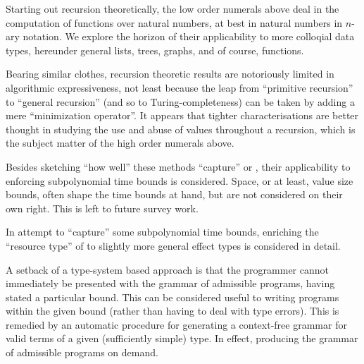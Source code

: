 Starting out recursion theoretically, the low order numerals above deal in the
computation of functions over natural numbers, at best in natural numbers in
$n$-ary notation.  We explore the horizon of their applicability to more
colloqial data types, hereunder general lists, trees, graphs, and of course,
functions.

Bearing similar clothes, recursion theoretic results are notoriously limited in
algorithmic expressiveness, not least because the leap from ``primitive
recursion'' to ``general recursion'' (and so to Turing-completeness) can be
taken by adding a mere ``minimization operator''. It appears that tighter
characterisations are better thought in studying the use and abuse of values
throughout a recursion, which is the subject matter of the high order numerals
above.

Besides sketching ``how well'' these methods ``capture'' \PTIME{} or \FPTIME{},
their applicability to enforcing subpolynomial time bounds is considered.
Space, or at least, value size bounds, often shape the time bounds at hand, but
are not considered on their own right. This is left to future survey work.

In attempt to ``capture'' some subpolynomial time bounds, enriching the
``resource type'' of \cite{hofmann-2003, aehlig-schwichtenberg-2002} to
slightly more general effect types\cite{gifford-lucassen-1986} is considered in
detail.

A setback of a type-system based approach is that the programmer cannot
immediately be presented with the grammar of admissible programs, having stated
a particular bound. This can be considered useful to writing programs within
the given bound (rather than having to deal with type errors). This is remedied
by an automatic procedure for generating a context-free grammar for valid terms
of a given (sufficiently simple) type.  In effect, producing the grammar of
admissible programs on demand.
